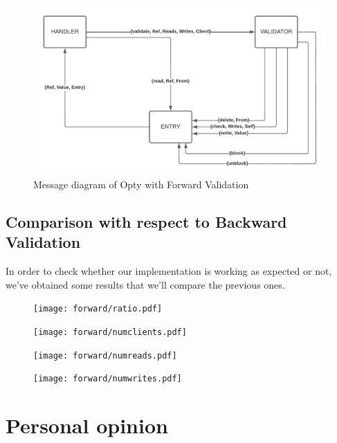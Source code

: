 \documentclass[a4paper, 10pt]{article}
\begin{document}
\begin{figure}[H]
  \centering
  \includegraphics[width=0.95\linewidth]{images/messagesForward.pdf}
    \caption{Message diagram of Opty with Forward Validation}
    \label{fig:diagram}
\end{figure} 


\subsection{Comparison with respect to Backward Validation}
In order to check whether our implementation is working as expected or not, we've obtained some results that we'll compare the previous ones. 

\begin{figure}[H]
  \centering
  \texttt{[image: forward/ratio.pdf]}
    \caption{}
    \label{}
\end{figure} 

\begin{figure}[H]
  \centering
  \texttt{[image: forward/numclients.pdf]}
    \caption{}
    \label{}
\end{figure} 

\begin{figure}[H]
  \centering
  \texttt{[image: forward/numreads.pdf]}
    \caption{}
    \label{}
\end{figure} 

\begin{figure}[H]
  \centering
  \texttt{[image: forward/numwrites.pdf]}
    \caption{}
    \label{}
\end{figure} 



\clearpage
\section{Personal opinion}
\end{document}

